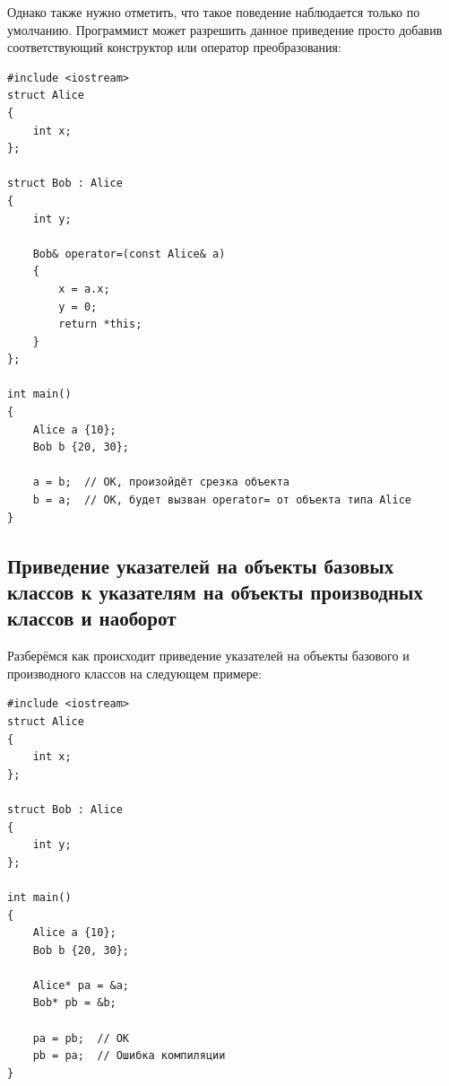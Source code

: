 \documentclass{article}
\begin{document}
\begin{enumerate}
Однако также нужно отметить, что такое поведение наблюдается только по умолчанию. Программист может разрешить данное приведение просто добавив соответствующий конструктор или оператор преобразования:
\begin{lstlisting}
#include <iostream>
struct Alice
{
	int x;
};

struct Bob : Alice
{
	int y;
	
	Bob& operator=(const Alice& a) 
	{
	    x = a.x;
	    y = 0;
	    return *this;
	}
};

int main()
{
	Alice a {10};
	Bob b {20, 30};

	a = b;  // ОК, произойдёт срезка объекта	
	b = a;  // ОК, будет вызван operator= от объекта типа Alice
}
\end{lstlisting}
\end{enumerate}

\newpage
\subsection*{Приведение указателей на объекты базовых классов к указателям на объекты производных классов и наоборот}
Разберёмся как происходит приведение указателей на объекты базового и производного классов на следующем примере:
\begin{lstlisting}
#include <iostream>
struct Alice
{
	int x;
};

struct Bob : Alice
{
	int y;
};

int main()
{
	Alice a {10};
	Bob b {20, 30};
	
	Alice* pa = &a;
	Bob* pb = &b;

	pa = pb;  // ОК
	pb = pa;  // Ошибка компиляции
}
\end{lstlisting}
\end{document}
